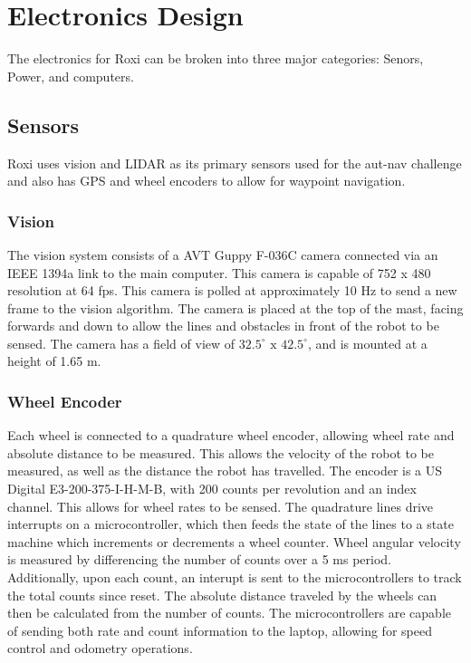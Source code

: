 \section{Electronics Design}

The electronics for Roxi can be broken into three major categories: Senors, Power, and computers.

\subsection{Sensors}

Roxi uses vision and LIDAR as its primary sensors used for the aut-nav challenge and also has GPS and wheel encoders to allow for waypoint navigation.

\subsubsection{Vision}

The vision system consists of a AVT Guppy F-036C camera connected via an IEEE 1394a link to the main computer. This camera is capable of 752 x 480 resolution at 64 fps. This camera is polled at approximately 10 Hz to send a new frame to the vision algorithm.  The camera is placed at the top of the mast, facing forwards and down to allow the lines and obstacles in front of the robot to be sensed. The camera has a field of view of $32.5^{\circ} \text{ x } 42.5^{\circ}$, and is mounted at a height of 1.65 m.

\subsubsection{Wheel Encoder}

Each wheel is connected to a quadrature wheel encoder, allowing wheel rate and absolute distance to be measured. This allows the velocity of the robot to be measured, as well as the distance the robot has travelled. The encoder is a US Digital E3-200-375-I-H-M-B, with 200 counts per revolution and an index channel. This allows for wheel rates to be sensed. The quadrature lines drive interrupts on a microcontroller, which then feeds the state of the lines to a state machine which increments or decrements a wheel counter. Wheel angular velocity is measured by differencing the number of counts over a 5 ms period. Additionally, upon each count, an interupt is sent to the microcontrollers to track the total counts since reset. The absolute distance traveled by the wheels can then be calculated from the number of counts. The microcontrollers are capable of sending both rate and count information to the laptop, allowing for speed control and odometry operations.

